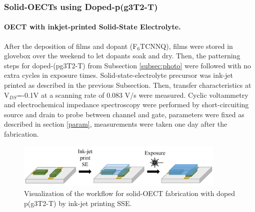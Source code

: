 \subsubsection{Solid-OECTs using Doped-p(g3T2-T)}

\paragraph{OECT with inkjet-printed Solid-State Electrolyte.}After the deposition of films and dopant (F$_{6}$TCNNQ), films were stored in glovebox over the weekend to let dopants soak and dry. Then, the patterning steps for doped-(pg3T2-T) from Subsection \ref{subsec:photo} were followed with no extra cycles in exposure times. Solid-state-electrolyte precursor was ink-jet printed as described in the previous Subsection. Then, transfer characteristics at V$_{DS}$=-0.1V at a scanning rate of 0.083 V/s were measured. Cyclic voltammetry and electrochemical impedance spectroscopy were performed by short-circuiting source and drain to probe between channel and gate, parameters were fixed as described in section \ref{param}, measurements were taken one day after the fabrication.

\begin{figure}[!ht]
	\centering
	\includegraphics[width=10cm]{Images/pdf/doped-sse.pdf}
	\caption[Solid-OECT fabrication with doped p(g3T2-T)]{Visualization of the workflow for solid-OECT fabrication with doped p(g3T2-T) by ink-jet printing SSE.}
	\label{fig:dopedsse}
\end{figure}

